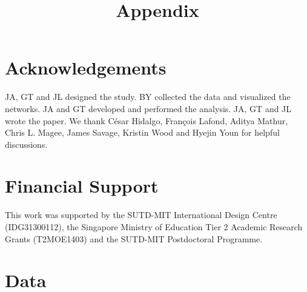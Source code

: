 \documentclass{dsj}
\newcommand{\beginsupplement}{%
\setcounter{table}{0}    \renewcommand{\thetable}{A\arabic{table}}     \setcounter{figure}{0} \renewcommand{\thefigure}{A\arabic{figure}}
}
\begin{document}
\section*{Acknowledgements}
JA, GT and JL designed the study. BY collected the data and visualized the networks. JA and GT developed and performed the analysis. JA, GT and JL wrote the paper. We thank César Hidalgo, François Lafond, Aditya Mathur, Chris L. Magee, James Savage, Kristin Wood and Hyejin Youn for helpful discussions.

\section*{Financial Support}
This work was supported by the SUTD-MIT International Design Centre (IDG31300112), the Singapore Ministry of Education Tier 2 Academic Research Grants (T2MOE1403) and the SUTD-MIT Postdoctoral Programme.

\printbibliography[]%

\newpage
\beginsupplement
\newrefsection

\title{Appendix}
\maketitle

\section{Data}
\end{document}
